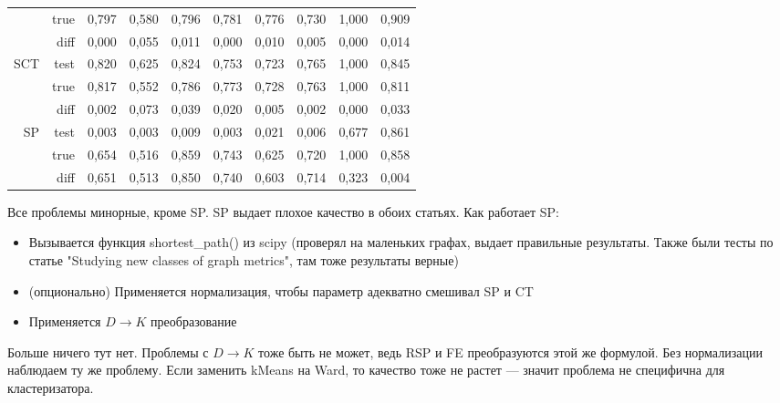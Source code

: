 \documentclass{article}
\begin{document}
\begin{table}[H]
\begin{tabular}{rr|rrrrrrrr}
       & true & 0,797        & 0,580        & 0,796        & 0,781        & 0,776        & 0,730        & 1,000   & 0,909    \\
       & diff & 0,000        & 0,055        & 0,011        & 0,000        & 0,010        & 0,005        & 0,000   & 0,014    \\
       \cline{2-10}
SCT    & test & 0,820        & 0,625        & 0,824        & 0,753        & 0,723        & 0,765        & 1,000   & 0,845    \\
       & true & 0,817        & 0,552        & 0,786        & 0,773        & 0,728        & 0,763        & 1,000   & 0,811    \\
       & diff & 0,002        & 0,073        & 0,039        & 0,020        & 0,005        & 0,002        & 0,000   & 0,033    \\
       \cline{2-10}
SP     & test & 0,003        & 0,003        & 0,009        & 0,003        & 0,021        & 0,006        & 0,677   & 0,861    \\
       & true & 0,654        & 0,516        & 0,859        & 0,743        & 0,625        & 0,720        & 1,000   & 0,858    \\
       & diff & \cellcolor{red!25} 0,651 & \cellcolor{red!25} 0,513 & \cellcolor{red!25} 0,850 &
                    \cellcolor{red!25} 0,740 & \cellcolor{red!25} 0,603 & \cellcolor{red!25} 0,714 & \cellcolor{yellow!25} 0,323   & 0,004   
\end{tabular}
\end{table}

Все проблемы минорные, кроме SP. SP выдает плохое качество в обоих статьях.
Как работает SP:
\begin{itemize}
  \item Вызывается функция shortest\_path() из scipy (проверял на маленьких графах, выдает правильные результаты. Также были тесты по статье "Studying new classes of graph metrics", там тоже результаты верные)
  \item (опционально) Применяется нормализация, чтобы параметр адекватно смешивал SP и CT
  \item Применяется $D \rightarrow K$ преобразование
\end{itemize}

Больше ничего тут нет. Проблемы с $D \rightarrow K$ тоже быть не может, ведь RSP и FE преобразуются этой же формулой. Без нормализации наблюдаем ту же проблему. Если заменить kMeans на Ward, то качество тоже не растет --- значит проблема не специфична для кластеризатора.
\end{document}
